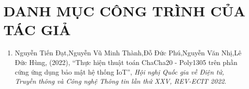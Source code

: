\chapter*{DANH MỤC CÔNG TRÌNH CỦA TÁC GIẢ}
\label{Appendix1}

\begin{enumerate}
\item Nguyễn Tiến Đạt,Nguyễn Vũ Minh Thành,Đỗ Đức Phú,Nguyễn Văn Nhị,Lê Đức Hùng, (2022), ``Thực hiện thuật toán ChaCha20 - Poly1305
trên phần cứng ứng dụng bảo mật hệ thống IoT'', \textit{Hội nghị Quốc gia về Điện tử, Truyền thông và Công nghệ Thông tin lần thứ XXV, REV-ECIT 2022}.
\end{enumerate}